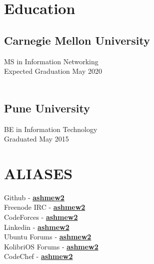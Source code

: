 \documentclass[letterpaper]{deedy-resume-openfont} %
\begin{document}
\begin{minipage}[t]{0.33\textwidth} %
\section{Education}

\subsection[Carnegie Mellon University]{Carnegie Mellon \newline University}
MS in Information Networking \\
Expected Graduation May 2020 \\
\  \\ %

\subsection{Pune University}
BE in Information Technology \\
Graduated May 2015 \\
\sectionsep %
\section{ALIASES}
Github - \href{https://github.com/ashmew2}{\bf ashmew2} \\
Freenode IRC - \href{http://freenode.org} {\bf ashmew2} \\
CodeForces - \href{http://codeforces.com/profile/ashmew2}{\bf ashmew2} \\
Linkedin - \href{in.linkedin.com/in/ashmew2/} {\bf ashmew2} \\
Ubuntu Forums - \href{http://ubuntuforums.org/showthread.php?t=821461} {\bf ashmew2} \\
KolibriOS Forums - \href{http://board.kolibrios.org/memberlist.php?mode=viewprofile&u=6211} {\bf ashmew2} \\
CodeChef - \href{http://www.codechef.com/users/ashmew2}{\bf ashmew2} \\
\sectionsep %

\end{minipage}
\end{document}
